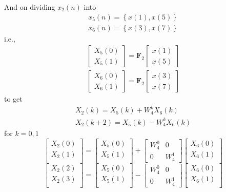 \documentclass[journal,12pt,twocolumn]{IEEEtran}
\providecommand{\cbrak}[1]{\ensuremath{\left\{#1\right\}}}
\let\vec\mathbf
\numberwithin{equation}{section}
\renewcommand\thesection{\arabic{section}}
\newcommand{\mymat}[1]{\ensuremath{\begin{bmatrix}#1\end{bmatrix}}}
\renewcommand\thesection{\arabic{section}}
\begin{document}
\begin{enumerate}[label=\arabic*.,ref=\thesection.\theenumi]
	And on dividing $x_2(n)$ into
	\begin{align}
		x_5(n) = \cbrak{x(1), x(5)} \\
		x_6(n) = \cbrak{x(3), x(7)}
	\end{align}
	i.e.,
	\begin{align}
		\mymat{X_5(0) \\ X_5(1)} = \vec{F}_2 \mymat{x(1) \\ x(5)} \\
		\mymat{X_6(0) \\ X_6(1)} = \vec{F}_2 \mymat{x(3) \\ x(7)}
	\end{align}
	to get
	\begin{align}
		X_2(k) = X_5(k) + W_4^k X_6(k) \\
		X_2(k + 2) = X_5(k) - W_4^k X_6(k) 
	\end{align}
	for $k = 0, 1$
\begin{equation}
\begin{bmatrix}
X_{2}(0) \\ 
X_{2}(1)\\ 
\end{bmatrix}
=
\begin{bmatrix}
X_{5}(0) \\ 
X_{5}(1)\\ 
\end{bmatrix}
+
\begin{bmatrix}
W^{0}_{4} & 0\\
0 & W^{1}_{4}
\end{bmatrix}
\begin{bmatrix}
X_{6}(0) \\ 
X_{6}(1) \\ 
\end{bmatrix}
\end{equation}
\begin{equation}
\begin{bmatrix}
X_{2}(2) \\ 
X_{2}(3)\\ 
\end{bmatrix}
=
\begin{bmatrix}
X_{5}(0) \\ 
X_{5}(1)\\ 
\end{bmatrix}
-
\begin{bmatrix}
W^{0}_{4} & 0\\
0 & W^{1}_{4}
\end{bmatrix}
\begin{bmatrix}
X_{6}(0) \\ 
X_{6}(1) \\ 
\end{bmatrix}
\end{equation}
	

\end{enumerate}
\end{document}
